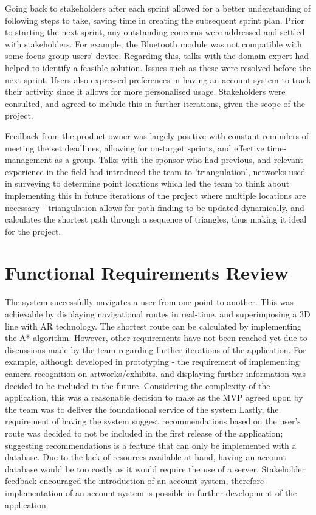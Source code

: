 Going back to stakeholders after each sprint allowed for a better understanding of following steps to take, saving time in creating the subsequent sprint plan. Prior to starting the next sprint, any outstanding concerns were addressed and settled with stakeholders. For example, the Bluetooth module was not compatible with some focus group users' device. Regarding this, talks with the domain expert had helped to identify a feasible solution. Issues such as these were resolved before the next sprint. Users also expressed preferences in having an account system to track their activity since it allows for more personalised usage. Stakeholders were consulted, and agreed to include this in further iterations, given the scope of the project. 

Feedback from the product owner was largely positive with constant reminders of meeting the set deadlines, allowing for on-target sprints, and effective time-management as a group. Talks with the sponsor who had previous, and relevant experience in the field had introduced the team to 'triangulation', networks used in surveying to determine point locations which led the team to think about implementing this in future iterations of the project where multiple locations are necessary - triangulation allows for path-finding to be updated dynamically, and calculates the shortest path through a sequence of triangles, thus making it ideal for the project.

\section{Functional Requirements Review}
The system successfully navigates a user from one point to another. This was achievable by displaying navigational routes in real-time, and superimposing a 3D line with AR technology. The shortest route can be calculated by implementing the A* algorithm. However, other requirements have not been reached yet due to discussions made by the team regarding further iterations of the application. For example, although developed in prototyping - the requirement of implementing camera recognition on artworks/exhibits. and displaying further information was decided to be included in the future. Considering the complexity of the application, this was a reasonable decision to make as the MVP agreed upon by the team was to deliver the foundational service of the system Lastly, the requirement of having the system suggest recommendations based on the user's route was decided to not be included in the first release of the application; suggesting recommendations is a feature that can only be implemented with a database. Due to the lack of resources available at hand, having an account database would be too costly as it would require the use of a server. Stakeholder feedback encouraged the introduction of an account system, therefore implementation of an account system is possible in further development of the application.

